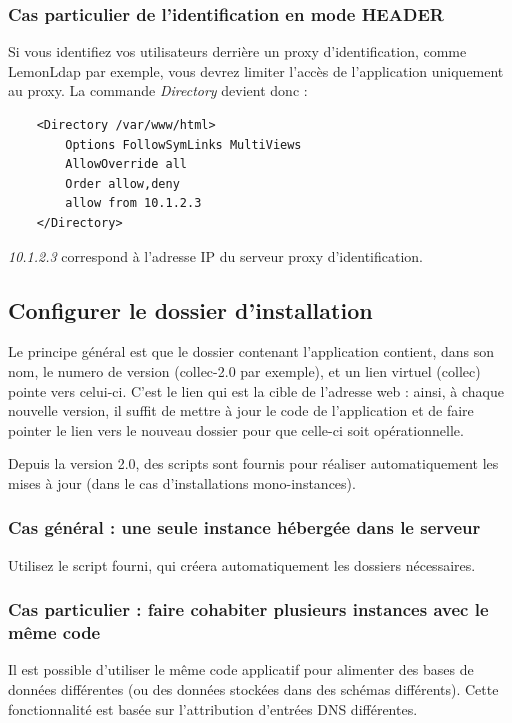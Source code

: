 \subsubsection{Cas particulier de l'identification en mode HEADER}

Si vous identifiez vos utilisateurs derrière un proxy d'identification, comme Lemon\-Ldap par exemple, vous devrez limiter l'accès de l'application uniquement au proxy. La commande \textit{Directory} devient donc :
\begin{lstlisting}
    <Directory /var/www/html>
        Options FollowSymLinks MultiViews
        AllowOverride all
        Order allow,deny
        allow from 10.1.2.3
    </Directory>

\end{lstlisting}
\textit{10.1.2.3} correspond à l'adresse IP du serveur proxy d'identification.

\subsection{Configurer le dossier d'installation}

Le principe général est que le dossier contenant l'application contient, dans son nom, le numero de version (collec-2.0 par exemple), et un lien virtuel (collec) pointe vers celui-ci. C'est le lien qui est la cible de l'adresse web : ainsi, à chaque nouvelle version, il suffit de mettre à jour le code de l'application et de faire pointer le lien vers le nouveau dossier pour que celle-ci soit opérationnelle.

Depuis la version 2.0, des scripts sont fournis pour réaliser automatiquement les mises à jour (dans le cas d'installations mono-instances).

\subsubsection{Cas général : une seule instance hébergée dans le serveur}

Utilisez le script fourni, qui créera automatiquement les dossiers nécessaires. 


\subsubsection{Cas particulier : faire cohabiter plusieurs instances avec le même code}
\label{dnsmultiple}
Il est possible d'utiliser le même code applicatif pour alimenter des bases de données différentes (ou des données stockées dans des schémas différents). Cette fonctionnalité est basée sur l'attribution d'entrées DNS différentes. 

